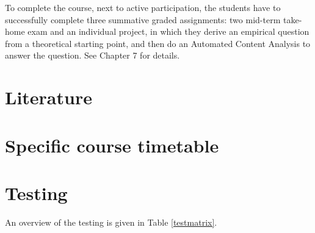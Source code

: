 \documentclass[a4paper,12pt]{report}
\begin{document}
To complete the course, next to active participation, the students have to successfully complete three summative graded assignments: two mid-term take-home exam and an individual project, in which they derive an empirical question from a theoretical starting point, and then do an Automated Content Analysis to answer the question. See Chapter 7 for details.


\chapter{Literature}




\chapter{Specific course timetable}





\chapter{Testing}
An overview of the testing is given in Table \ref{testmatrix}.
\end{document}
